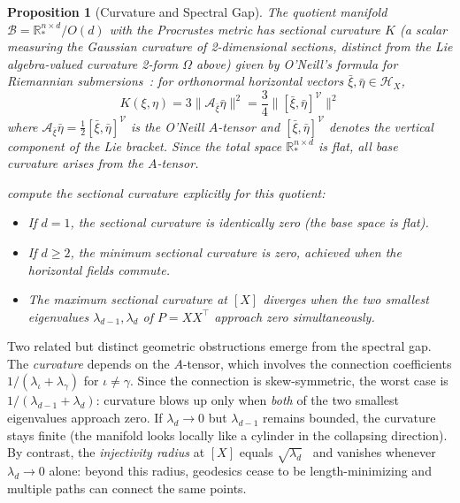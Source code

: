 \documentclass{article}
\newcommand{\RR}{\mathbb{R}}
\theoremstyle{plain}
\newtheorem{proposition}{Proposition}
\theoremstyle{definition}
\theoremstyle{remark}
\begin{document}
\begin{proposition}[Curvature and Spectral Gap]\label{prop:curv-spectral-gap}
The quotient manifold $\mathcal{B} = \RR_*^{n \times d} / O(d)$ with the Procrustes metric has \emph{sectional curvature} $K$ (a scalar measuring the Gaussian curvature of 2-dimensional sections, distinct from the Lie algebra-valued curvature 2-form $\Omega$ above) given by O'Neill's formula for Riemannian submersions~\citep{oneill1966fundamental}: for orthonormal horizontal vectors $\bar{\xi}, \bar{\eta} \in \mathcal{H}_X$,
\begin{equation}
K(\xi, \eta) = 3 \|\mathcal{A}_{\bar{\xi}} \bar{\eta}\|^2 = \frac{3}{4} \|[\bar{\xi}, \bar{\eta}]^{\mathcal{V}}\|^2
\end{equation}
where $\mathcal{A}_{\bar{\xi}} \bar{\eta} = \frac{1}{2} [\bar{\xi}, \bar{\eta}]^{\mathcal{V}}$ is the O'Neill $A$-tensor and $[\bar{\xi}, \bar{\eta}]^{\mathcal{V}}$ denotes the vertical component of the Lie bracket. Since the total space $\RR_*^{n \times d}$ is flat, all base curvature arises from the $A$-tensor.

\citet{massart2019curvature} compute the sectional curvature explicitly for this quotient:
\begin{itemize}
\item If $d = 1$, the sectional curvature is identically zero (the base space is flat).
\item If $d \ge 2$, the minimum sectional curvature is zero, achieved when the horizontal fields commute.
\item The maximum sectional curvature at $[X]$ diverges when the two smallest eigenvalues $\lambda_{d-1}, \lambda_d$ of $P = XX^\top$ approach zero simultaneously.
\end{itemize}
\end{proposition}

Two related but distinct geometric obstructions emerge from the spectral gap.
The \emph{curvature} depends on the $A$-tensor, which involves the connection coefficients $1/(\lambda_\iota + \lambda_\gamma)$ for $\iota \neq \gamma$.
Since the connection is skew-symmetric, the worst case is $1/(\lambda_{d-1} + \lambda_d)$: curvature blows up only when \emph{both} of the two smallest eigenvalues approach zero.
If $\lambda_d \to 0$ but $\lambda_{d-1}$ remains bounded, the curvature stays finite (the manifold looks locally like a cylinder in the collapsing direction).
By contrast, the \emph{injectivity radius} at $[X]$ equals $\sqrt{\lambda_d}$~\citep{massart2020quotient} and vanishes whenever $\lambda_d \to 0$ alone: beyond this radius, geodesics cease to be length-minimizing and multiple paths can connect the same points.
\end{document}
